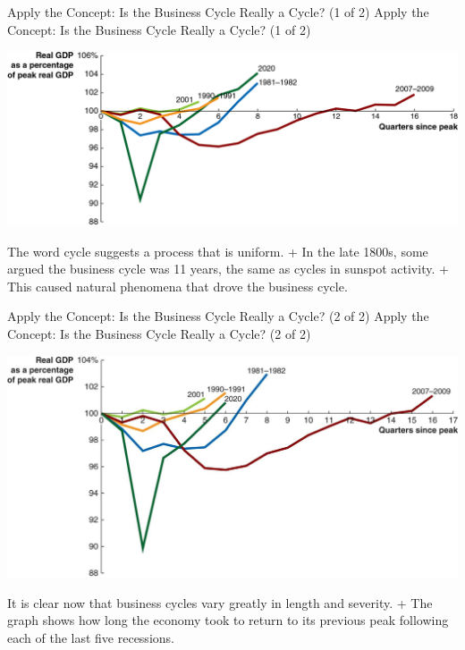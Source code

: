 \documentclass[
  12pt,
  ignorenonframetext,
]{beamer}
\begin{document}
\begin{frame}{Apply the Concept: Is the Business Cycle Really a Cycle?
(1 of 2)}
\protect\hypertarget{apply-the-concept-is-the-business-cycle-really-a-cycle-1-of-2}{}
Apply the Concept: Is the Business Cycle Really a Cycle? (1 of 2)

\includegraphics[width=\textwidth,height=0.99\textheight]{imgs3/img_slide42a.png}

The word cycle suggests a process that is uniform. + In the late 1800s,
some argued the business cycle was 11 years, the same as cycles in
sunspot activity. + This caused natural phenomena that drove the
business cycle.
\end{frame}

\begin{frame}{Apply the Concept: Is the Business Cycle Really a Cycle?
(2 of 2)}
\protect\hypertarget{apply-the-concept-is-the-business-cycle-really-a-cycle-2-of-2}{}
Apply the Concept: Is the Business Cycle Really a Cycle? (2 of 2)

\includegraphics[width=\textwidth,height=0.99\textheight]{imgs3/img_slide43a.png}

It is clear now that business cycles vary greatly in length and
severity. + The graph shows how long the economy took to return to its
previous peak following each of the last five recessions.
\end{frame}
\end{document}
